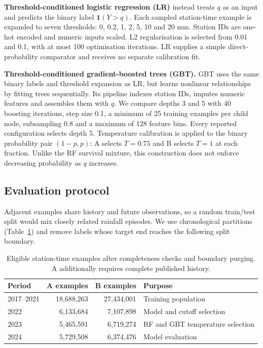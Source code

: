 \documentclass[11pt,a4paper]{article}
\begin{document}
\textbf{Threshold-conditioned logistic regression (LR)} instead treats $q$ as an input and predicts the binary label $\mathbf1(Y>q)$. Each sampled station-time example is expanded to seven thresholds: 0, 0.2, 1, 2, 5, 10 and 20 mm. Station IDs are one-hot encoded and numeric inputs scaled. L2 regularisation is selected from 0.01 and 0.1, with at most 100 optimisation iterations. LR supplies a simple direct-probability comparator and receives no separate calibration fit.

\textbf{Threshold-conditioned gradient-boosted trees (GBT).} GBT uses the same binary labels and threshold expansion as LR, but learns nonlinear relationships by fitting trees sequentially. Its pipeline indexes station IDs, imputes numeric features and assembles them with $q$. We compare depths 3 and 5 with 40 boosting iterations, step size 0.1, a minimum of 25 training examples per child node, subsampling 0.8 and a maximum of 128 feature bins. Every reported configuration selects depth 5. Temperature calibration is applied to the binary probability pair $(1-p,p)$: A selects $T=0.75$ and B selects $T=1$ at each fraction. Unlike the RF survival mixture, this construction does not enforce decreasing probability as $q$ increases.

\subsection{Evaluation protocol}
Adjacent examples share history and future observations, so a random train/test split would mix closely related rainfall episodes. We use chronological partitions (Table~\ref{tab:t2splits}) and remove labels whose target end reaches the following split boundary.
\begin{table}[htbp]\centering\small
\begin{tabular}{lrrp{.29\linewidth}}\toprule
Period & A examples & B examples & Purpose\\\midrule
2017--2021 & 18,688,263 & 27,434,001 & Training population \\
2022 & 6,133,684 & 7,107,898 & Model and cutoff selection \\
2023 & 5,465,591 & 6,719,274 & RF and GBT temperature selection \\
2024 & 5,729,508 & 6,374,476 & Model evaluation \\
\bottomrule\end{tabular}
\caption{Eligible station-time examples after completeness checks and boundary purging. A additionally requires complete published history.}\label{tab:t2splits}
\end{table}
\end{document}
